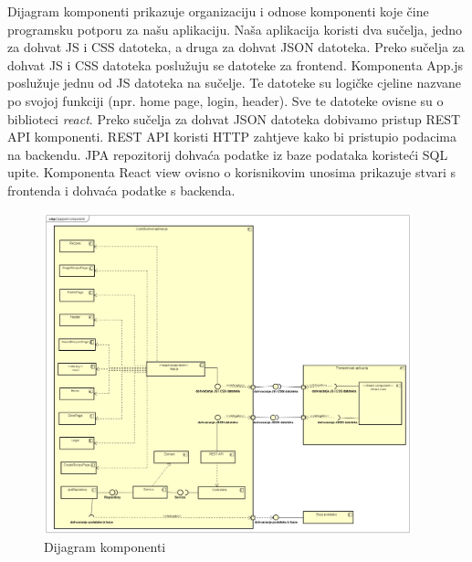 		\noindent Dijagram komponenti prikazuje organizaciju i odnose komponenti koje čine programsku potporu za našu aplikaciju. Naša aplikacija koristi dva sučelja, jedno za dohvat JS i CSS datoteka, a druga za dohvat JSON datoteka. Preko sučelja za dohvat JS i CSS datoteka poslužuju se datoteke za frontend. Komponenta App.js poslužuje jednu od JS datoteka na sučelje. Te datoteke su logičke cjeline nazvane po svojoj funkciji (npr. home page, login, header). Sve te datoteke ovisne su o biblioteci \textit{react}. Preko sučelja za dohvat JSON datoteka dobivamo pristup REST API komponenti. REST API koristi HTTP zahtjeve kako bi pristupio podacima na backendu. JPA repozitorij dohvaća podatke iz baze podataka koristeći SQL upite. Komponenta React view ovisno o korisnikovim unosima prikazuje stvari s frontenda i dohvaća podatke s backenda.
			
			\begin{figure}[H]
				\centering
				\includegraphics[width=0.95\textwidth]{slike/dijagrami/Dijagram komponenti.png}
				\caption{Dijagram komponenti}
				\label{fig:enter-label}
			\end{figure}